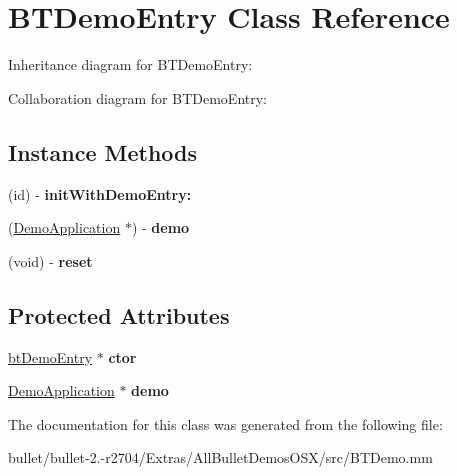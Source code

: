 \hypertarget{interface_b_t_demo_entry}{\section{B\+T\+Demo\+Entry Class Reference}
\label{interface_b_t_demo_entry}
}


Inheritance diagram for B\+T\+Demo\+Entry\+:


Collaboration diagram for B\+T\+Demo\+Entry\+:
\subsection*{Instance Methods}
\begin{DoxyCompactItemize}
\item 
\hypertarget{interface_b_t_demo_entry_ae7aad183c5b25dcf470d3dcf5ade47a9}{(id) -\/ {\bfseries init\+With\+Demo\+Entry\+:}}\label{interface_b_t_demo_entry_ae7aad183c5b25dcf470d3dcf5ade47a9}

\item 
\hypertarget{interface_b_t_demo_entry_a351acc844061fee8cbd5365ceb646101}{(\hyperlink{class_demo_application}{Demo\+Application} $\ast$) -\/ {\bfseries demo}}\label{interface_b_t_demo_entry_a351acc844061fee8cbd5365ceb646101}

\item 
\hypertarget{interface_b_t_demo_entry_a05bb97f0f78397e4e456ad642cf2b33c}{(void) -\/ {\bfseries reset}}\label{interface_b_t_demo_entry_a05bb97f0f78397e4e456ad642cf2b33c}

\end{DoxyCompactItemize}
\subsection*{Protected Attributes}
\begin{DoxyCompactItemize}
\item 
\hypertarget{interface_b_t_demo_entry_a5708e16aafa55bc2d950c961f4afb900}{\hyperlink{structbt_demo_entry}{bt\+Demo\+Entry} $\ast$ {\bfseries ctor}}\label{interface_b_t_demo_entry_a5708e16aafa55bc2d950c961f4afb900}

\item 
\hypertarget{interface_b_t_demo_entry_a19d8a77f97e6589024d87763519ecb94}{\hyperlink{class_demo_application}{Demo\+Application} $\ast$ {\bfseries demo}}\label{interface_b_t_demo_entry_a19d8a77f97e6589024d87763519ecb94}

\end{DoxyCompactItemize}


The documentation for this class was generated from the following file\+:\begin{DoxyCompactItemize}
\item 
bullet/bullet-\/2.-\/r2704/\+Extras/\+All\+Bullet\+Demos\+O\+S\+X/src/B\+T\+Demo.\+mm\end{DoxyCompactItemize}
